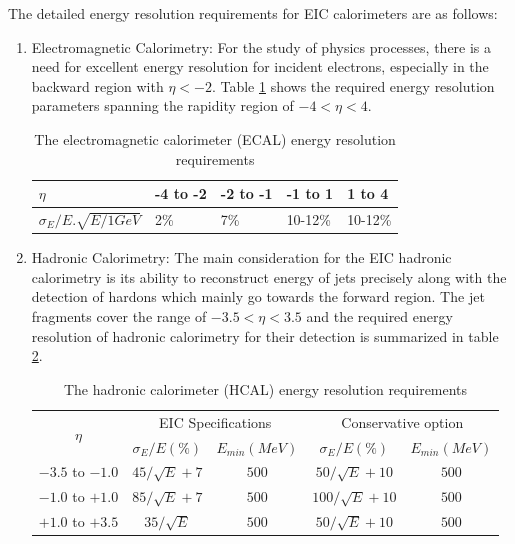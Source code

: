 The detailed energy resolution requirements for EIC calorimeters are as follows:
\begin{enumerate}
    \item Electromagnetic Calorimetry: For the study of physics processes, there is a need for excellent energy resolution for incident electrons, especially in the backward region with $\eta < -2$. Table \ref{table:g1_ch1_t1} shows the required energy resolution parameters spanning the rapidity region of $-4 < \eta < 4$.
        \begin{table}[H]
        \centering
        \begin{tabular}{ | m{8em} | m{1.5cm}| m{1.5cm} | m{1.5cm} | m{1.5cm} |} 
        \hline
        $\eta $ & -4 to -2 & -2 to -1 & -1 to 1 & 1 to 4 \\ 
        \hline
        $\sigma _E/E . \sqrt{E/1 GeV}$ & 2\% & 7\% & 10-12\% & 10-12\%\\ 
        \hline
        \end{tabular}
        \caption{The electromagnetic calorimeter (ECAL) energy resolution requirements}
        \label{table:g1_ch1_t1}
        \end{table}
        
    \item Hadronic Calorimetry: The main consideration for the EIC hadronic calorimetry is its ability to reconstruct energy of jets precisely along with the detection of hardons which mainly go towards the forward region. The jet fragments cover the range of $-3.5 < \eta < 3.5$ and the required energy resolution of hadronic calorimetry for their detection is summarized in table \ref{table:g1_ch1_t2}.
      
        \begin{table}[H]
        \centering
        \begin{tabular}{|c|c|c|c|c|}
        \hline
        \multirow{2}{*}{$\eta$} & \multicolumn{2}{|c|}{EIC Specifications} & \multicolumn{2}{|c|}{Conservative option} \\ 
        \hhline{~----}
        & $\sigma_E/E (\%)$ & $E_{min} (MeV)$ & $\sigma_E/E (\%)$ & $E_{min} (MeV)$ \\
        \hline
        $-3.5$ to $-1.0$ & $45/\sqrt{E}+7$ & $500$ & $50/\sqrt{E}+10$ & $500$\\
        \hline
        $-1.0$ to $+1.0$ & $85/\sqrt{E}+7$ & $500$ & $100/\sqrt{E}+10$ & $500$\\
        \hline
        $+1.0$ to $+3.5$ & $35/\sqrt{E}$ & $500$ & $50/\sqrt{E}+10$ & $500$\\
        \hline
        \end{tabular}
        \caption{The hadronic calorimeter (HCAL) energy resolution requirements}
        \label{table:g1_ch1_t2}
        \end{table}
\end{enumerate}

